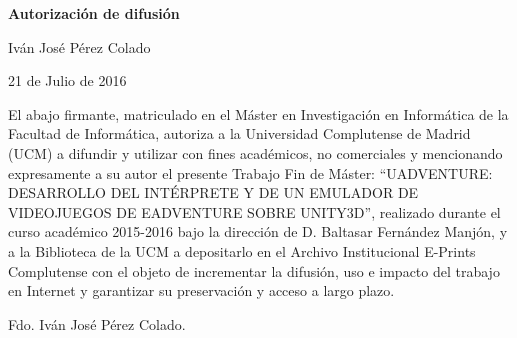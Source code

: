 
\newpage

\thispagestyle{empty}

\begin{center}

{\bf \Huge Autorización de difusión}

\vspace{1cm}


   \large Iván José Pérez Colado\\

   \vspace{0.5cm}


   21 de Julio de 2016\\

   \vspace{0.5cm}
   \end{center}
   
El abajo firmante, matriculado en el Máster en Investigación en Informática de la Facultad de Informática, autoriza a la Universidad Complutense de Madrid (UCM) a difundir y utilizar con fines académicos, no comerciales y mencionando expresamente a su autor el presente Trabajo Fin de Máster: “UADVENTURE: DESARROLLO DEL INTÉRPRETE Y DE UN EMULADOR DE VIDEOJUEGOS DE EADVENTURE SOBRE UNITY3D”, realizado durante el curso académico 2015-2016 bajo la dirección de D. Baltasar Fernández Manjón, y a la Biblioteca de la UCM a depositarlo en el Archivo Institucional E-Prints Complutense con el objeto de incrementar la difusión, uso e impacto del trabajo en Internet y garantizar su preservación y acceso a largo plazo.


\begin{flushright}
	\vspace{3cm}
	Fdo. Iván José Pérez Colado.
\end{flushright}






